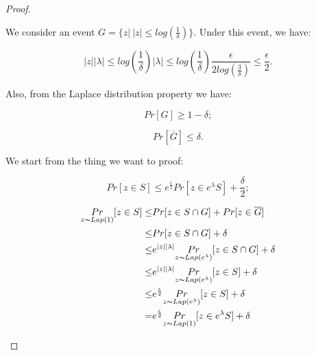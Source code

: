\documentclass{article}
\begin{document}
\begin{proof}
\begin{itemize}
	We consider an event $G = \{z |\ |z|\leq log(\frac{1}{\delta}) \}$. Under this event, we have:

	\begin{equation*}
	|z||\lambda| \leq log(\frac{1}{\delta})|\lambda| \leq log(\frac{1}{\delta})\frac{\epsilon}{2 log(\frac{3}{\delta})} \leq \frac{\epsilon}{2}.
	\end{equation*}

	Also, from the Laplace distribution property we have:

	\begin{equation*}
	Pr[G] \geq 1 - \delta ;
	\end{equation*}

	\begin{equation*}
	Pr[\overline{G}] \leq \delta .
	\end{equation*}

	We start from the thing we want to proof:

	\begin{equation*}
	Pr[z \in S] \leq e^{\frac{\epsilon}{2}} Pr[z \in e^{\lambda} S] + \frac{\delta}{2};
	\end{equation*}

	\begin{equation*}
	\begin{split}
	\underset{z \thicksim Lap(1)}{Pr}[z \in S] \leq & Pr[z \in S \cap G] + Pr[z \in \overline{G}]\\
	\leq 	& Pr[z \in S \cap G] + \delta\\
	\leq 	& e^{|z||\lambda|} \underset{z \thicksim Lap(e^{\lambda})}{Pr}[z \in S \cap G] + \delta \\
	\leq	& e^{|z||\lambda|} \underset{z \thicksim Lap(e^{\lambda})}{Pr}[z \in S] + \delta\\
	\leq	& e^{\frac{\epsilon}{2}} \underset{z \thicksim Lap(e^{\lambda})}{Pr}[z \in S] + \delta\\
	=		& e^{\frac{\epsilon}{2}} \underset{z \thicksim Lap(1)}{Pr}[z \in e^{\lambda} S] + \delta\\
	\end{split}
	\end{equation*}

\end{itemize}

\end{proof} 




\end{document}
